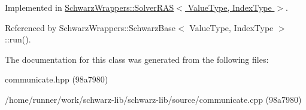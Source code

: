 Implemented in \hyperlink{classSchwarzWrappers_1_1SolverRAS_a1a741b69e1cd7623c6e2d8467aedaa7c}{Schwarz\+Wrappers\+::\+Solver\+R\+A\+S$<$ Value\+Type, Index\+Type $>$}.



Referenced by Schwarz\+Wrappers\+::\+Schwarz\+Base$<$ Value\+Type, Index\+Type $>$\+::run().



The documentation for this class was generated from the following files\+:\begin{DoxyCompactItemize}
\item 
communicate.\+hpp (98a7980)\item 
/home/runner/work/schwarz-\/lib/schwarz-\/lib/source/communicate.\+cpp (98a7980)\end{DoxyCompactItemize}
